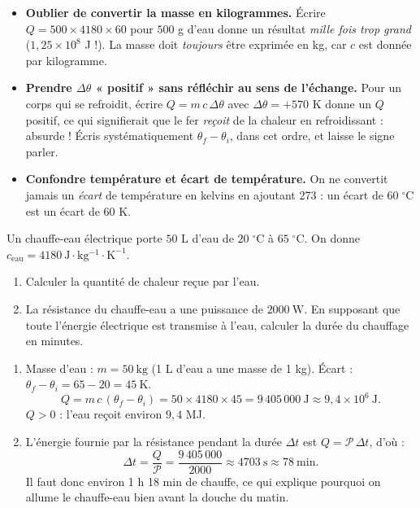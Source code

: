 \documentclass[11pt]{article}
\begin{document}
\begin{attention}
\begin{itemize}
\item \textbf{Oublier de convertir la masse en kilogrammes.} Écrire $Q = 500 \times 4180 \times 60$ pour $500$ g d'eau donne un résultat \emph{mille fois trop grand} ($1,25 \times 10^{8}$ J !). La masse doit \emph{toujours} être exprimée en kg, car $c$ est donnée par kilogramme.
\item \textbf{Prendre $\Delta\theta$ « positif » sans réfléchir au sens de l'échange.} Pour un corps qui se refroidit, écrire $Q = m\,c\,\Delta\theta$ avec $\Delta\theta = +570$ K donne un $Q$ positif, ce qui signifierait que le fer \emph{reçoit} de la chaleur en refroidissant : absurde ! Écris systématiquement $\theta_f - \theta_i$, dans cet ordre, et laisse le signe parler.
\item \textbf{Confondre température et écart de température.} On ne convertit jamais un \emph{écart} de température en kelvins en ajoutant 273 : un écart de $60\;^\circ$C est un écart de $60$ K.
\end{itemize}
\end{attention}

\begin{exercice}
Un chauffe-eau électrique porte $50$ L d'eau de $20\;^\circ\mathrm{C}$ à $65\;^\circ\mathrm{C}$. On donne $c_{\text{eau}} = 4180\ \mathrm{J\cdot kg^{-1}\cdot K^{-1}}$.
\begin{enumerate}
\item Calculer la quantité de chaleur reçue par l'eau.
\item La résistance du chauffe-eau a une puissance de $2000\ \mathrm{W}$. En supposant que toute l'énergie électrique est transmise à l'eau, calculer la durée du chauffage en minutes.
\end{enumerate}
\end{exercice}

\begin{corrige}
\begin{enumerate}
\item Masse d'eau : $m = 50\ \mathrm{kg}$ (1 L d'eau a une masse de 1 kg). Écart : $\theta_f - \theta_i = 65 - 20 = 45\ \mathrm{K}$.
\[
Q = m\,c\,(\theta_f - \theta_i) = 50 \times 4180 \times 45 = 9\,405\,000\ \mathrm{J} \approx 9,4 \times 10^{6}\ \mathrm{J}.
\]
$Q > 0$ : l'eau reçoit environ $9,4$ MJ.
\item L'énergie fournie par la résistance pendant la durée $\Delta t$ est $Q = \mathcal{P}\,\Delta t$, d'où :
\[
\Delta t = \frac{Q}{\mathcal{P}} = \frac{9\,405\,000}{2000} \approx 4703\ \mathrm{s} \approx 78\ \mathrm{min}.
\]
Il faut donc environ 1 h 18 min de chauffe, ce qui explique pourquoi on allume le chauffe-eau bien avant la douche du matin.
\end{enumerate}
\end{corrige}
\end{document}
